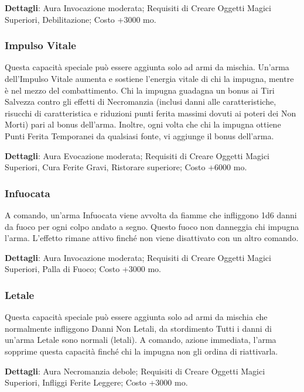 \begin{multicols}{2}
\textbf{Dettagli}: Aura Invocazione moderata; Requisiti di Creare Oggetti Magici Superiori, Debilitazione; Costo +3000 mo.

\subsubsection{Impulso Vitale}

Questa capacità speciale può essere aggiunta solo ad armi da mischia. Un'arma dell'Impulso Vitale aumenta e sostiene l'energia vitale di chi la impugna, mentre è nel mezzo del combattimento. Chi la impugna guadagna un bonus ai Tiri Salvezza contro gli effetti di Necromanzia (inclusi danni alle caratteristiche, risucchi di caratteristica e riduzioni punti ferita massimi dovuti ai poteri dei Non Morti) pari al bonus dell'arma. Inoltre, ogni volta che chi la impugna ottiene Punti Ferita Temporanei da qualsiasi fonte, vi aggiunge il bonus dell'arma.

\textbf{Dettagli}: Aura Evocazione moderata; Requisiti di Creare Oggetti Magici Superiori, Cura Ferite Gravi, Ristorare superiore; Costo +6000 mo.

\subsubsection{Infuocata}

A comando, un'arma Infuocata viene avvolta da fiamme che infliggono 1d6 danni da fuoco per ogni colpo andato a segno. Questo fuoco non danneggia chi impugna l'arma. L'effetto rimane attivo finché non viene disattivato con un altro comando.

\textbf{Dettagli}: Aura Invocazione moderata; Requisiti di Creare Oggetti Magici Superiori, Palla di Fuoco; Costo +3000 mo.

\subsubsection{Letale}

Questa capacità speciale può essere aggiunta solo ad armi da mischia che normalmente infliggono Danni Non Letali, da stordimento Tutti i danni di un'arma Letale sono normali (letali). A comando, azione immediata, l'arma sopprime questa capacità finché chi la impugna non gli ordina di riattivarla.

\textbf{Dettagli}: Aura Necromanzia debole; Requisiti di Creare Oggetti Magici Superiori, Infliggi Ferite Leggere; Costo +3000 mo.


\end{multicols}
